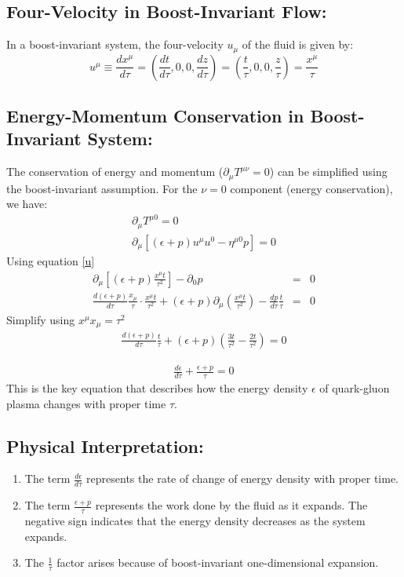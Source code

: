 \documentclass{article}
\begin{document}
\subsection{Four-Velocity in Boost-Invariant Flow:}
In a boost-invariant system, the four-velocity \(u_\mu\) of the fluid is given by:
\begin{equation}
\label{u}
    u^\mu \equiv \frac{dx^{\mu}}{d\tau} = \left(\frac{dt}{d\tau},0,0,\frac{dz}{d\tau}\right)=  \left(\frac{t}{\tau},0,0,\frac{z}{\tau}\right)=\frac{x^\mu}{\tau}    
\end{equation}

\subsection{Energy-Momentum Conservation in Boost-Invariant System:}
The conservation of energy and momentum ($\partial_\mu T^{\mu\nu} = 0$) can be simplified using the boost-invariant assumption. For the \(\nu = 0\) component (energy conservation), we have:
\begin{eqnarray}
    \partial_\mu T^{\mu 0} = 0 \\
    \partial_\mu\left[(\epsilon + p)u^\mu u^0 - \eta^{\mu 0}p\right] = 0
\end{eqnarray}
Using equation \eqref{u}
\begin{eqnarray}
    \partial_\mu\left[(\epsilon + p)\frac{x^\mu t}{\tau^2}\right] - \partial_0 p &=& 0 \\
    \frac{d(\epsilon + p)}{d\tau}\frac{x_\mu}{\tau}\cdot\frac{x^\mu t}{\tau^2} + (\epsilon + p)\partial_\mu\left(\frac{x^\mu t}{\tau^2}\right) -\frac{dp}{d\tau}\frac{t}{\tau} &=& 0
\end{eqnarray}
Simplify using $x^\mu x_\mu = \tau^2$
\begin{eqnarray}
    \frac{d(\epsilon + p)}{d\tau}\frac{t}{\tau} + (\epsilon + p)\left(\frac{3t}{\tau^2} - \frac{2t}{\tau^2}\right)  = 0
\end{eqnarray}

\begin{eqnarray}
    \frac{d\epsilon}{d\tau} + \frac{\epsilon + p}{\tau} = 0
\end{eqnarray}
This is the key equation that describes how the energy density \(\epsilon\) of quark-gluon plasma changes with proper time $\tau$.

\subsection{Physical Interpretation:}
\begin{enumerate}
    \item The term $\frac{d\epsilon}{d\tau}$ represents the rate of change of energy density with proper time.
    \item The term $\frac{\epsilon + p}{\tau}$ represents the work done by the fluid as it expands. The negative sign indicates that the energy density decreases as the system expands.
    \item The  $\frac{1}{\tau}$ factor arises because of boost-invariant one-dimensional expansion.
\end{enumerate}
\end{document}
